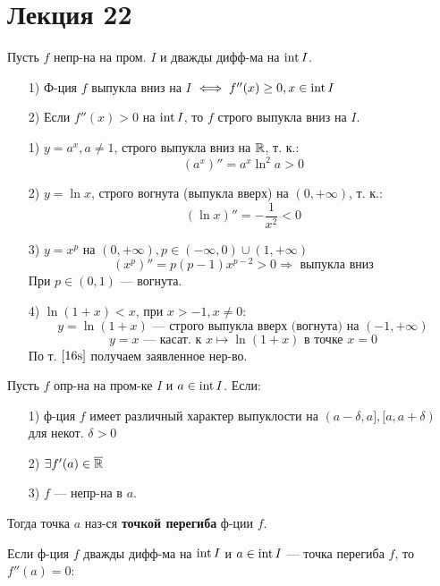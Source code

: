 \section{Лекция 22}
\begin{consequence}
Пусть $f$ непр-на на пром. $I$ и дважды дифф-ма на $\operatorname{int} I$.
\begin{itemize}
  \item [1) ] Ф-ция $f$ выпукла вниз на $I$ $\iff f''(x) \geq 0, x \in \operatorname{int} I$
  \item[2) ] Если $f''(x) > 0$ на $\operatorname{int} I$, то $f$ строго выпукла вниз на $I$.
\end{itemize}
\end{consequence}
\begin{example}
\begin{itemize}
  \item [1) ] $y = a^{x}, a \neq 1$, строго выпукла вниз на $\mathbb{R}$, т. к.:
    \[
      (a^{x})'' = a^{x}\ln^{2} a > 0
    \]
  \item [2) ] $y = \ln x$, строго вогнута (выпукла вверх) на $(0, +\infty)$, т. к.:
    \[
      (\ln x)'' = -\frac{1}{x^{2}} < 0
    \]
  \item [3) ] $y = x^{p}$ на $(0, +\infty), p \in (-\infty, 0) \cup (1, +\infty)$
    \[
      (x^{p})'' = p(p - 1)x^{p - 2} > 0 \Rightarrow \text{ выпукла вниз}
    \]
    При $p \in (0, 1)$ --- вогнута.
  \item [4) ] $\ln(1 + x) < x$, при $x > -1, x \neq 0$:
    \[
    y = \ln(1 + x) \text{ --- строго выпукла вверх (вогнута) на $(-1, +\infty)$}
    \]
    \[
    y = x \text{ --- касат. к $x \mapsto \ln(1 + x)$ в точке $x = 0$}
    \]
    По т. $\ref{16s}$ получаем заявленное нер-во.
\end{itemize}
\end{example}
\begin{definition}
Пусть $f$ опр-на на пром-ке $I$ и $a \in \operatorname{int} I$. Если:
\begin{itemize}
  \item [1) ] ф-ция $f$ имеет различный характер выпуклости на $(a - \delta, a], [a, a + \delta)$ для некот. $\delta > 0$
  \item [2) ] $\exists f'(a) \in \overline{\mathbb{R}}$
  \item [3) ] $f$ --- непр-на в $a$.
\end{itemize}
Тогда точка $a$ наз-ся \textbf{точкой перегиба} ф-ции $f$.
\end{definition}
\begin{consequence}
Если ф-ция $f$ дважды дифф-ма на $\operatorname{int} I$ и $a \in \operatorname{int} I$ --- точка перегиба $f$, то $f''(a) = 0$:
\end{consequence}
